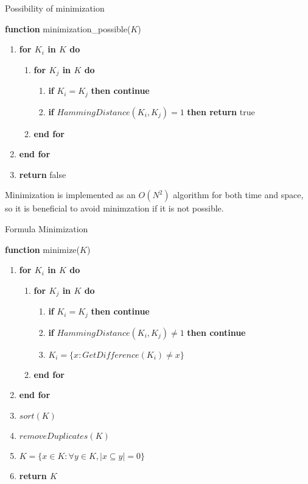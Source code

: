 \documentclass[english]{article}
\begin{document}
\begin{algorithm}[H]

\caption{Possibility of minimization}

\textbf{function }minimization\_possible($K$)
\begin{enumerate}
\item \textbf{for $K_{i}$ in $K$ do}
\begin{enumerate}
\item \textbf{for $K_{j}$ in $K$ do}
\begin{enumerate}
\item \textbf{if }$K_{i}=K_{j}$ \textbf{then continue}
\item \textbf{if }$HammingDistance(K_{i},K_{j})=1$\textbf{ then return
}true
\end{enumerate}
\item \textbf{end for}
\end{enumerate}
\item \textbf{end for}
\item \textbf{return }false
\end{enumerate}
\end{algorithm}

Minimization is implemented as an $O(N^{2})$ algorithm for both time
and space, so it is beneficial to avoid minimzation if it is not possible.

\begin{algorithm}[H]

\caption{Formula Minimization}

\textbf{function }minimize($K$)
\begin{enumerate}
\item \textbf{for $K_{i}$ in $K$ do}
\begin{enumerate}
\item \textbf{for $K_{j}$ in $K$ do}
\begin{enumerate}
\item \textbf{if }$K_{i}=K_{j}$ \textbf{then continue}
\item \textbf{if }$HammingDistance(K_{i},K_{j})\neq1$\textbf{ then continue}
\item $K_{i}=\{x:GetDifference(K_{i})\neq x\}$
\end{enumerate}
\item \textbf{end for}
\end{enumerate}
\item \textbf{end for}
\item $sort(K)$
\item $removeDuplicates(K)$
\item $K=\{x\in K:\forall y\in K,|x\subseteq y|=0\}$
\item \textbf{return $K$}
\end{enumerate}
\end{algorithm}
\end{document}
